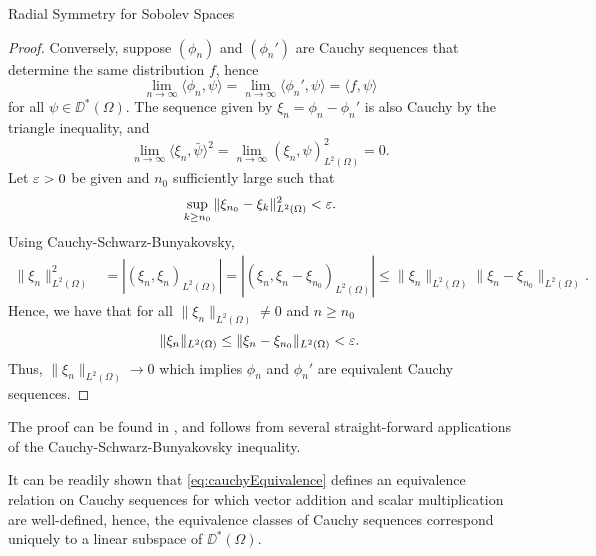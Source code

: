 \begin{chapter}{Radial Symmetry for Sobolev Spaces}
\begin{com}
\begin{proof}
  Conversely, suppose $(\phi_n)$ and $(\phi_n')$ are Cauchy sequences that determine the same distribution $f$, hence
  \begin{equation}
    \lim_{n\to\infty} \langle \phi_n,\psi\rangle = \lim_{n\to\infty} \langle \phi_n',\psi\rangle = \langle f,\psi\rangle
  \end{equation}
  for all $\psi \in \DD^*(\Omega)$.
  The sequence given by $\xi_n = \phi_n - \phi_n'$ is also Cauchy by the triangle inequality, and 
  \begin{equation}
    \lim_{n\to\infty}\langle \xi_n,\bar{\psi}\rangle^2 = \lim_{n\to\infty} (\xi_n,\psi)_{L^2(\Omega)}^2 = 0.
  \end{equation}
  Let $\varepsilon >0$ be given and $n_0$ sufficiently large such that 
  \begin{equation}
    \sup_{k\ge n_0} \|\xi_{n_0} - \xi_k\|_{L^2(\Omega)}^2 < \varepsilon.
  \end{equation}
  Using Cauchy-Schwarz-Bunyakovsky,
  \begin{align}
    \|\xi_n\|_{L^2(\Omega)}^2 &= |(\xi_n,\xi_n)_{L^2(\Omega)}| = |(\xi_n,\xi_n - \xi_{n_0})_{L^2(\Omega)}| \le \|\xi_n\|_{L^2(\Omega)}\|\xi_n-\xi_{n_0}\|_{L^2(\Omega)}.
  \end{align}
  Hence, we have that for all $\|\xi_n\|_{L^2(\Omega)} \not= 0$ and $n \ge n_0$
  \begin{equation}
    \|\xi_n\|_{L^2(\Omega)} \le \|\xi_n - \xi_{n_0}\|_{L^2(\Omega)} < \varepsilon.
  \end{equation}
  Thus, $\|\xi_n\|_{L^2(\Omega)} \to 0$ which implies $\phi_n$ and $\phi_n'$ are equivalent Cauchy sequences.
\end{proof}
\end{com}
The proof can be found in \citep{richtmyer1978principles}, and follows from several straight-forward applications of the Cauchy-Schwarz-Bunyakovsky inequality.

It can be readily shown that \eqref{eq:cauchyEquivalence} defines an equivalence relation on Cauchy sequences for which vector addition and scalar multiplication are well-defined, hence, the equivalence classes of Cauchy sequences correspond uniquely to a linear subspace of $\DD^*(\Omega)$.


\end{chapter}
